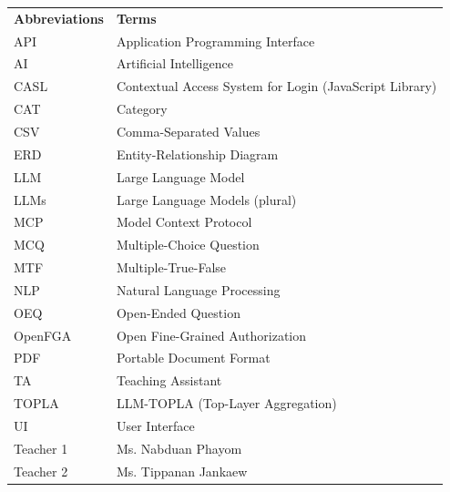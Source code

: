 \begin{tabular}{p{} l}
  
\textbf{Abbreviations} & \textbf{Terms}\\ 
API & Application Programming Interface\\
AI & Artificial Intelligence\\
CASL & Contextual Access System for Login (JavaScript Library)\\
CAT & Category\\
CSV & Comma-Separated Values\\
ERD & Entity-Relationship Diagram\\
LLM & Large Language Model\\
LLMs & Large Language Models (plural)\\
MCP & Model Context Protocol\\
MCQ & Multiple-Choice Question\\
MTF & Multiple-True-False\\
NLP & Natural Language Processing\\
OEQ & Open-Ended Question\\
OpenFGA & Open Fine-Grained Authorization\\
PDF & Portable Document Format\\
TA & Teaching Assistant\\
TOPLA & LLM-TOPLA (Top-Layer Aggregation)\\
UI & User Interface\\
Teacher 1 & Ms. Nabduan Phayom\\
Teacher 2 & Ms. Tippanan Jankaew

\end{tabular}



